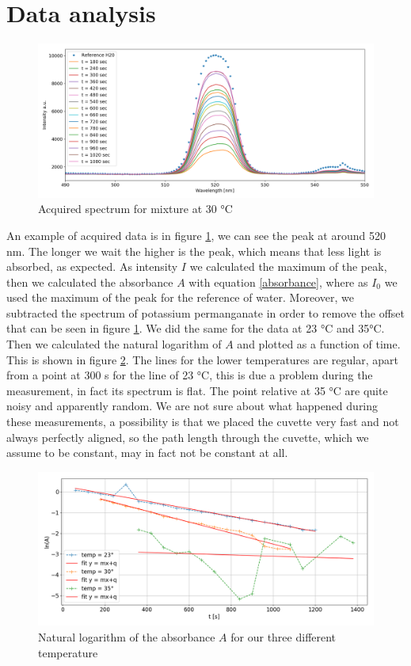 \documentclass[a4paper,10pt]{article}
\begin{document}
\section{Data analysis}
\begin{figure}[H]
\centering
\includegraphics[width=\textwidth]{spectrum30}
\caption{Acquired spectrum for mixture at 30 °C}\label{spectrum}
\end{figure}
An example of acquired data is in figure \ref{spectrum}, we can see the peak at around 520 nm. The longer we wait the higher is the peak, which means that less light is absorbed, as expected. 
As intensity $I$ we calculated the maximum of the peak, then we calculated the absorbance $A$ with equation \eqref{absorbance}, where as $I_0$ we used the maximum of the peak for the reference of water. Moreover, we subtracted the spectrum of potassium permanganate in order to remove the offset that can be seen in figure \ref{spectrum}. We did the same for the data at 23 °C and 35°C. Then we calculated the natural logarithm of $A$ and plotted as a function of time. This is shown in figure \ref{fit}. The lines for the lower temperatures are regular, apart from a point at 300 s for the line of 23 °C, this is due a problem during the measurement, in fact its spectrum is flat. The point relative at 35 °C are quite noisy and apparently random. We are not sure about what happened during these measurements, a possibility is that we placed the cuvette very fast and not always perfectly aligned, so the path length through the cuvette, which we assume to be constant, may in fact not be constant at all. 
\begin{figure}[H]
\centering
\includegraphics[width=\textwidth]{fit}
\caption{Natural logarithm of the absorbance $A$ for our three different temperature}\label{fit}
\end{figure}
\end{document}
